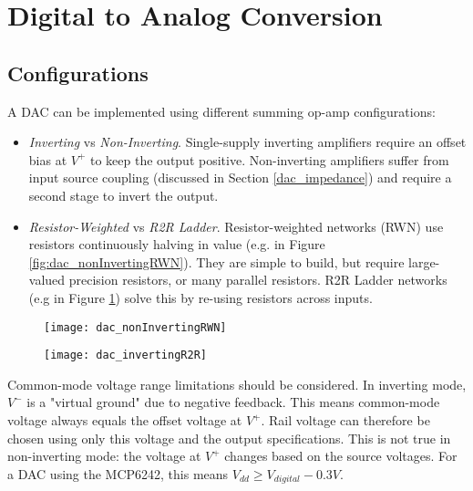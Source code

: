 \graphicspath{{content/1_literatureReview/figures/}}
\section{Digital to Analog Conversion}

\subsection{Configurations}

A DAC can be implemented using different summing op-amp configurations:
\begin{itemize}
    \item \textit{Inverting} vs \textit{Non-Inverting}. Single-supply inverting amplifiers require an offset bias at $V^+$ to keep the output positive.
          Non-inverting amplifiers suffer from input source coupling (discussed in Section \ref{dac_impedance}) and require a second stage to invert the output.
    \item \textit{Resistor-Weighted} vs \textit{R2R Ladder}. Resistor-weighted networks (RWN) use resistors continuously halving in value
          (e.g. in Figure \ref{fig:dac_nonInvertingRWN}). They are simple to build, but require large-valued precision resistors, or many parallel resistors.
          R2R Ladder networks (e.g in Figure \ref{fig:dac_invertingR2R}) solve this by re-using resistors across inputs.
\end{itemize}

\begin{figure}[!htb]
    \centering
    \begin{minipage}{.44\textwidth}
        \centering
        \texttt{[image: dac\_nonInvertingRWN]}
        \label{fig:dac_nonInvertingRWN}
    \end{minipage}
    \begin{minipage}{.4\textwidth}
        \centering
        \texttt{[image: dac\_invertingR2R]}
        \label{fig:dac_invertingR2R}
    \end{minipage}
\end{figure}

Common-mode voltage range limitations should be considered. In inverting mode, $V^-$ is a "virtual ground" due to negative feedback.
This means common-mode voltage always equals the offset voltage at $V^+$. Rail voltage can therefore be chosen using only this voltage
and the output specifications. This is not true in non-inverting mode: the voltage at $V^+$ changes based on the source voltages.
For a DAC using the MCP6242, this means $V_{dd} \geq V_{digital} - 0.3 V$.

